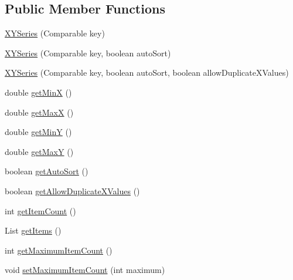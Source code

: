 \subsection*{Public Member Functions}
\begin{DoxyCompactItemize}
\item 
\mbox{\hyperlink{classorg_1_1jfree_1_1data_1_1xy_1_1_x_y_series_ab67e0945184ee334b3f77de7a61da618}{X\+Y\+Series}} (Comparable key)
\item 
\mbox{\hyperlink{classorg_1_1jfree_1_1data_1_1xy_1_1_x_y_series_a45edbd9d252fb211373316df9cacac44}{X\+Y\+Series}} (Comparable key, boolean auto\+Sort)
\item 
\mbox{\hyperlink{classorg_1_1jfree_1_1data_1_1xy_1_1_x_y_series_ab7bfd6ca2dee007aeb5760e862e650d9}{X\+Y\+Series}} (Comparable key, boolean auto\+Sort, boolean allow\+Duplicate\+X\+Values)
\item 
double \mbox{\hyperlink{classorg_1_1jfree_1_1data_1_1xy_1_1_x_y_series_a5d9d477f95bd6b6d3e0662f26eb58447}{get\+MinX}} ()
\item 
double \mbox{\hyperlink{classorg_1_1jfree_1_1data_1_1xy_1_1_x_y_series_a1fd6e9dd33f4e78955e2ead151cbf43f}{get\+MaxX}} ()
\item 
double \mbox{\hyperlink{classorg_1_1jfree_1_1data_1_1xy_1_1_x_y_series_a4d5a819937e869b22195efc457ba6da7}{get\+MinY}} ()
\item 
double \mbox{\hyperlink{classorg_1_1jfree_1_1data_1_1xy_1_1_x_y_series_a2e78207e795f8be478094042858c1bb0}{get\+MaxY}} ()
\item 
boolean \mbox{\hyperlink{classorg_1_1jfree_1_1data_1_1xy_1_1_x_y_series_aecb5fbcd290d5585c7bbf1fd41d097d3}{get\+Auto\+Sort}} ()
\item 
boolean \mbox{\hyperlink{classorg_1_1jfree_1_1data_1_1xy_1_1_x_y_series_a4f29b263ea1deae978f94f1ab8e83272}{get\+Allow\+Duplicate\+X\+Values}} ()
\item 
int \mbox{\hyperlink{classorg_1_1jfree_1_1data_1_1xy_1_1_x_y_series_a7e7f90e3c6019a8591e2c3e8518965d5}{get\+Item\+Count}} ()
\item 
List \mbox{\hyperlink{classorg_1_1jfree_1_1data_1_1xy_1_1_x_y_series_a0162d1af1c6129de5feea414d26fa8cc}{get\+Items}} ()
\item 
int \mbox{\hyperlink{classorg_1_1jfree_1_1data_1_1xy_1_1_x_y_series_a5bfd8c0b9c0dc7e27c030c742e372b49}{get\+Maximum\+Item\+Count}} ()
\item 
void \mbox{\hyperlink{classorg_1_1jfree_1_1data_1_1xy_1_1_x_y_series_a523412c86de56ff2f9dc800dc65a9b2c}{set\+Maximum\+Item\+Count}} (int maximum)

\end{DoxyCompactItemize}
